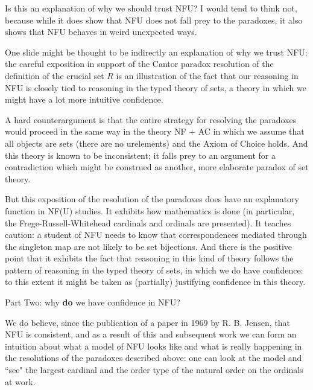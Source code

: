 \documentclass{slides}
\begin{document}
\begin{slide}

Is this an explanation of why we should trust NFU?  I would tend to think not, because while it does show that NFU does not fall prey to the paradoxes, it also shows that NFU behaves in weird unexpected ways.

One slide might be thought to be indirectly an explanation of why we trust NFU:  the careful exposition in support of the Cantor paradox resolution of the definition of
the crucial set $R$ is an illustration of the fact that our reasoning in NFU is closely tied to reasoning in the typed theory of sets, a theory in which we might have a lot more intuitive confidence.

A hard counterargument is that the entire strategy for resolving the paradoxes would proceed in the same way in the theory NF + AC in which we assume that all objects are sets (there are no urelements) and the Axiom of Choice holds.  And this theory is known to be inconsistent;  it falls prey to an argument for a contradiction which might be construed as another, more elaborate paradox of set theory.


\end{slide}

\begin{slide}

But this exposition of the resolution of the paradoxes does have an explanatory function in NF(U) studies.  It exhibits how mathematics is done (in particular, the Frege-Russell-Whitehead cardinals and ordinals are presented).  It teaches caution:  a student of NFU needs to know that correspondences mediated through the singleton map are not likely to be set bijections.  And there is the positive point that it exhibits the fact that reasoning in this kind of theory follows the pattern of reasoning in the typed theory of sets, in which we do have confidence:  to this extent it might be taken as (partially) justifying confidence in this theory.

\end{slide}

\begin{slide}

{\Large Part Two:  why {\bf do} we have confidence in NFU?}

We do believe, since the publication of a paper in 1969 by R. B. Jensen, that NFU is consistent, and as a result of this and subsequent work we can form an intuition about what a model of NFU looks like and what is really happening in the resolutions of the paradoxes described above:  one can look at the model and ``see" the largest cardinal and the order type of the natural order on the ordinals at work.

\end{slide}
\end{document}
